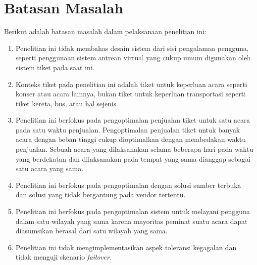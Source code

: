 \section{Batasan Masalah}
\label{sec:batasan-masalah}

Berikut adalah batasan masalah dalam pelaksanaan penelitian ini:

\begin{enumerate}
  \item Penelitian ini tidak membahas desain sistem dari sisi pengalaman pengguna, seperti penggunaan sistem antrean virtual yang cukup umum digunakan oleh sistem tiket pada saat ini.
  \item Konteks tiket pada penelitian ini adalah tiket untuk keperluan acara seperti konser atau acara lainnya, bukan tiket untuk keperluan transportasi seperti tiket kereta, bus, atau hal sejenis.
  \item Penelitian ini berfokus pada pengoptimalan penjualan tiket untuk satu acara pada satu waktu penjualan. Pengoptimalan penjualan tiket untuk banyak acara dengan beban tinggi cukup dioptimalkan dengan membedakan waktu penjualan. Sebuah acara yang dilaksanakan selama beberapa hari pada waktu yang berdekatan dan dilaksanakan pada tempat yang sama dianggap sebagai satu acara yang sama.
  \item Penelitian ini berfokus pada pengoptimalan dengan solusi sumber terbuka dan solusi yang tidak bergantung pada vendor tertentu.
  \item Penelitian ini berfokus pada pengoptimalan sistem untuk melayani pengguna dalam satu wilayah yang sama karena mayoritas peminat suatu acara dapat diasumsikan berasal dari satu wilayah yang sama.
  \item Penelitian ini tidak mengimplementasikan aspek toleransi kegagalan dan tidak menguji skenario \textit{failover}.
\end{enumerate}

